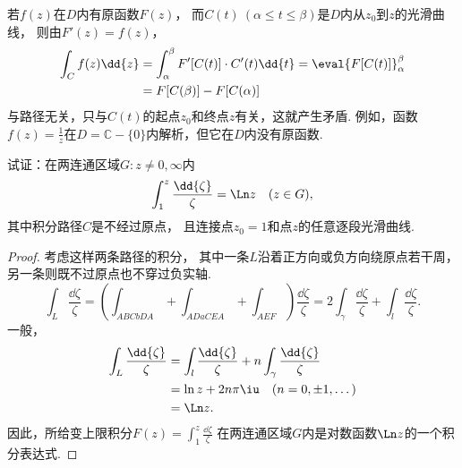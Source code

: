 若\(f(z)\)在\(D\)内有原函数\(F(z)\)，
而\(C(t)\ (\alpha\leq t \leq\beta)\)是\(D\)内从\(z_0\)到\(z\)的光滑曲线，
则由\(F'(z) = f(z)\)，
\begin{align*}
	\int_C f(z) \dd{z}
	&= \int_\alpha^\beta F'[C(t)] \cdot C'(t) \dd{t}
	= \eval{F[C(t)]}_\alpha^\beta \\
	&= F[C(\beta)] - F[C(\alpha)]
\end{align*}
与路径无关，只与\(C(t)\)的起点\(z_0\)和终点\(z\)有关，这就产生矛盾.
例如，函数\(f(z) = \frac{1}{z}\)在\(D=\mathbb{C}-\{0\}\)内解析，但它在\(D\)内没有原函数.
\begin{example}%
\def\f{\frac{\dd{\zeta}}{\zeta}}
试证：在两连通区域\(G: z\neq0,\infty\)内\begin{equation*}
	\int_1^z \f
	= \Ln z
	\quad (z \in G),
\end{equation*}
其中积分路径\(C\)是不经过原点，
且连接点\(z_0=1\)和点\(z\)的任意逐段光滑曲线.
\begin{proof}
考虑这样两条路径的积分，
其中一条\(L\)沿着正方向或负方向绕原点若干周，
另一条则既不过原点也不穿过负实轴.
\begin{equation*}
	\int_L \f
	= \left(\int_{ABCbDA} + \int_{ADaCEA} + \int_{AEF}\right) \f
	= 2 \int_\gamma \f + \int_l \f.
\end{equation*}
一般，\begin{align*}
	\int_L \f
	&= \int_l \f + n \int_\gamma \f \\
	&= \ln z + 2n\pi\iu \quad(n=0,\pm1,\dotsc) \\
	&= \Ln z.
\end{align*}
因此，所给变上限积分\(F(z) = \int_1^z \f\)
在两连通区域\(G\)内是对数函数\(\Ln z\)的一个积分表达式.
\end{proof}
\end{example}

